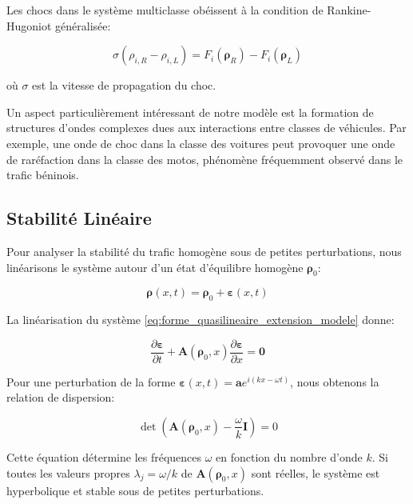 Les chocs dans le système multiclasse obéissent à la condition de Rankine-Hugoniot généralisée:

\begin{equation}
\sigma (\rho_{i,R} - \rho_{i,L}) = F_i(\boldsymbol{\rho}_R) - F_i(\boldsymbol{\rho}_L)
\end{equation}

où $\sigma$ est la vitesse de propagation du choc.

Un aspect particulièrement intéressant de notre modèle est la formation de structures d'ondes complexes dues aux interactions entre classes de véhicules. Par exemple, une onde de choc dans la classe des voitures peut provoquer une onde de raréfaction dans la classe des motos, phénomène fréquemment observé dans le trafic béninois.

\subsection{Stabilité Linéaire}
\label{subsec:stabilite_lineaire}

Pour analyser la stabilité du trafic homogène sous de petites perturbations, nous linéarisons le système autour d'un état d'équilibre homogène $\boldsymbol{\rho}_0$:

\begin{equation}
\boldsymbol{\rho}(x,t) = \boldsymbol{\rho}_0 + \boldsymbol{\varepsilon}(x,t)
\end{equation}

La linéarisation du système \eqref{eq:forme_quasilineaire_extension_modele} donne:

\begin{equation}
\frac{\partial \boldsymbol{\varepsilon}}{\partial t} + \mathbf{A}(\boldsymbol{\rho}_0, x) \frac{\partial \boldsymbol{\varepsilon}}{\partial x} = \mathbf{0}
\end{equation}

Pour une perturbation de la forme $\boldsymbol{\varepsilon}(x,t) = \boldsymbol{a} e^{i(kx-\omega t)}$, nous obtenons la relation de dispersion:

\begin{equation}
\det(\mathbf{A}(\boldsymbol{\rho}_0, x) - \frac{\omega}{k}\mathbf{I}) = 0
\end{equation}

Cette équation détermine les fréquences $\omega$ en fonction du nombre d'onde $k$. Si toutes les valeurs propres $\lambda_j = \omega/k$ de $\mathbf{A}(\boldsymbol{\rho}_0, x)$ sont réelles, le système est hyperbolique et stable sous de petites perturbations.

